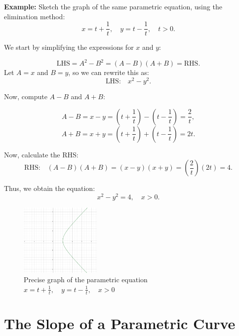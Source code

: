 \documentclass{article}
\begin{document}
\begin{examplebox}
\textbf{Example:} Sketch the graph of the same parametric equation, using the elimination method:
\[
x = t + \frac{1}{t}, \quad y = t - \frac{1}{t}, \quad t > 0.
\]

\begin{solutionbox}
    We start by simplifying the expressions for \( x \) and \( y \):
    
    \[
    \text{LHS} = A^2 - B^2 = (A - B)(A + B) = \text{RHS}.
    \]
    Let \( A = x \) and \( B = y \), so we can rewrite this as:
    \[
    \text{LHS:} \quad x^2 - y^2.
    \]
    
    Now, compute \( A - B \) and \( A + B \):
    
    \[
    A - B = x - y = \left( t + \frac{1}{t} \right) - \left( t - \frac{1}{t} \right) = \frac{2}{t},
    \]
    \[
    A + B = x + y = \left( t + \frac{1}{t} \right) + \left( t - \frac{1}{t} \right) = 2t.
    \]
    
    Now, calculate the RHS:
    \[
    \text{RHS:} \quad (A - B)(A + B) = (x - y)(x + y) = \left( \frac{2}{t} \right)(2t) = 4.
    \]
    
    Thus, we obtain the equation:
    \[
    x^2 - y^2 = 4, \quad x > 0.
    \]

    \begin{figure}[H]
    \centering
    \includegraphics[width=0.35\textwidth]{hyperbola_nicer.jpg}
    \caption{Precise graph of the parametric equation \( x = t + \frac{1}{t}, \quad y = t - \frac{1}{t}, \quad x > 0 \)}
    \end{figure}
\end{solutionbox}    
\end{examplebox}    

\section*{The Slope of a Parametric Curve}
\end{document}
